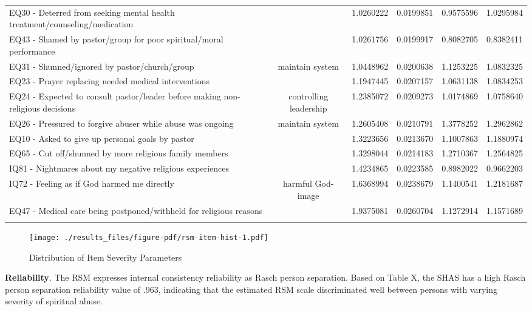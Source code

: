 \documentclass[
  letterpaper,
  DIV=11,
  numbers=noendperiod]{scrreport}
\begin{document}
\begin{longtable}[t]{>{\raggedright\arraybackslash}p{11cm}ccccc}
EQ30 - Deterred from seeking mental health treatment/counseling/medication &  & 1.0260222 & 0.0199851 & 0.9575596 & 1.0295984\\
\addlinespace
EQ43 - Shamed by pastor/group for poor spiritual/moral performance &  & 1.0261756 & 0.0199917 & 0.8082705 & 0.8382411\\
*EQ31 - Shunned/ignored by pastor/church/group & maintain system & 1.0448962 & 0.0200638 & 1.1253225 & 1.0832325\\
EQ23 - Prayer replacing needed medical interventions &  & 1.1947445 & 0.0207157 & 1.0631138 & 1.0834253\\
*EQ24 - Expected to consult pastor/leader before making non-religious decisions & controlling leadership & 1.2385072 & 0.0209273 & 1.0174869 & 1.0758640\\
*EQ26 - Pressured to forgive abuser while abuse was ongoing & maintain system & 1.2605408 & 0.0210791 & 1.3778252 & 1.2962862\\
\addlinespace
EQ10 - Asked to give up personal goals by pastor &  & 1.3223656 & 0.0213670 & 1.1007863 & 1.1880974\\
EQ65 - Cut off/shunned by more religious family members &  & 1.3298044 & 0.0214183 & 1.2710367 & 1.2564825\\
IQ81 - Nightmares about my negative religious experiences &  & 1.4234865 & 0.0223585 & 0.8982022 & 0.9662203\\
*IQ72 - Feeling as if God harmed me directly & harmful God-image & 1.6368994 & 0.0238679 & 1.1400541 & 1.2181687\\
EQ47 - Medical care being postponed/withheld for religious reasons &  & 1.9375081 & 0.0260704 & 1.1272914 & 1.1571689\\*
\end{longtable}

\begin{figure}

{\centering \texttt{[image: ./results\_files/figure-pdf/rsm-item-hist-1.pdf]}

}

\caption{Distribution of Item Severity Parameters}

\end{figure}

\textbf{Reliability}. The RSM expresses internal consistency reliability
as Rasch person separation. Based on Table X, the SHAS has a high Rasch
person separation reliability value of .963, indicating that the
estimated RSM scale discriminated well between persons with varying
severity of spiritual abuse.
\end{document}
